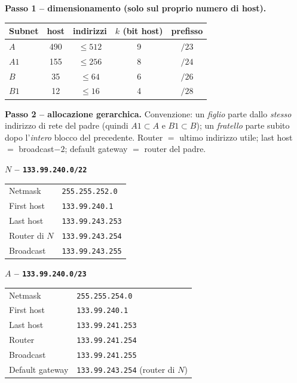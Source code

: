 \documentclass{report}
\begin{document}
\begin{solution}
\textbf{Passo 1 -- dimensionamento (solo sul proprio numero di host).}
\begin{center}
\begin{tabular}{lcccc}
\hline
Subnet & host & indirizzi & $k$ (bit host) & prefisso \\
\hline
$A$  & 490 & $\le 512$ & 9 & $/23$ \\
$A1$ & 155 & $\le 256$ & 8 & $/24$ \\
$B$  & 35  & $\le 64$  & 6 & $/26$ \\
$B1$ & 12  & $\le 16$  & 4 & $/28$ \\
\hline
\end{tabular}
\end{center}

\textbf{Passo 2 -- allocazione gerarchica.} Convenzione: un \emph{figlio} parte
dallo \emph{stesso} indirizzo di rete del padre (quindi $A1\subset A$ e
$B1\subset B$); un \emph{fratello} parte subito dopo l'\emph{intero} blocco del
precedente. Router $=$ ultimo indirizzo utile; last host $=$ broadcast$-2$;
default gateway $=$ router del padre.

\medskip
\noindent\textbf{$N$ -- \texttt{133.99.240.0/22}}
\begin{center}
\begin{tabular}{ll}
\hline
Netmask & \texttt{255.255.252.0} \\
First host & \texttt{133.99.240.1} \\
Last host & \texttt{133.99.243.253} \\
Router di $N$ & \texttt{133.99.243.254} \\
Broadcast & \texttt{133.99.243.255} \\
\hline
\end{tabular}
\end{center}

\noindent\textbf{$A$ -- \texttt{133.99.240.0/23}}
\begin{center}
\begin{tabular}{ll}
\hline
Netmask & \texttt{255.255.254.0} \\
First host & \texttt{133.99.240.1} \\
Last host & \texttt{133.99.241.253} \\
Router & \texttt{133.99.241.254} \\
Broadcast & \texttt{133.99.241.255} \\
Default gateway & \texttt{133.99.243.254} (router di $N$) \\
\hline
\end{tabular}
\end{center}


\end{solution}
\end{document}
